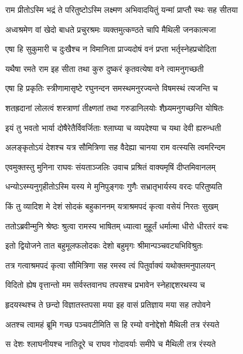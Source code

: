 \twolineshloka
{राम प्रीतोऽस्मि भद्रं ते परितुष्टोऽस्मि लक्ष्मण}
{अभिवादयितुं यन्मां प्राप्तौ स्थः सह सीतया} %

\twolineshloka
{अध्वश्रमेण वां खेदो बाधते प्रचुरश्रमः}
{व्यक्तमुत्कण्ठते चापि मैथिली जनकात्मजा} %

\twolineshloka
{एषा हि सुकुमारी च दुःखैश्च न विमानिता}
{प्राज्यदोषं वनं प्रप्ता भर्तृस्नेहप्रचोदिता} %

\twolineshloka
{यथैषा रमते राम इह सीता तथा कुरु}
{दुष्करं कृतवत्येषा वने त्वामनुगच्छती} %

\twolineshloka
{एषा हि प्रकृतिः स्त्रीणामासृष्टे रघुनन्दन}
{समस्थमनुरज्यन्ते विषमस्थं त्यजन्ति च} %

\twolineshloka
{शतह्रदानां लोलत्वं शस्त्राणां तीक्ष्णतां तथा}
{गरुडानिलयोः शैघ्र्यमनुगच्छन्ति योषितः} %

\twolineshloka
{इयं तु भवतो भार्या दोषैरेतैर्विवर्जिताः}
{श्लाघ्या च व्यपदेश्या च यथा देवी ह्यरुन्धती} %

\twolineshloka
{अलङ्कृतोऽयं देशश्च यत्र सौमित्रिणा सह}
{वैदेह्या चानया राम वत्स्यसि त्वमरिन्दम} %

\twolineshloka
{एवमुक्तस्तु मुनिना राघवः संयताञ्जलिः}
{उवाच प्रश्रितं वाक्यमृषिं दीप्तमिवानलम्} %

\twolineshloka
{धन्योऽस्म्यनुगृहीतोऽस्मि यस्य मे मुनिपुङ्गवः}
{गुणैः सभ्रातृभार्यस्य वरदः परितुष्यति} %

\twolineshloka
{किं तु व्यादिश मे देशं सोदकं बहुकाननम्}
{यत्राश्रमपदं कृत्वा वसेयं निरतः सुखम्} %

\twolineshloka
{ततोऽब्रवीन्मुनि श्रेष्ठः श्रुत्वा रामस्य भाषितम्}
{ध्यात्वा मुहूर्तं धर्मात्मा धीरो धीरतरं वचः} %

\twolineshloka
{इतो द्वियोजने तात बहुमूलफलोदकः}
{देशो बहुमृगः श्रीमान्पञ्चवट्यभिविश्रुतः} %

\twolineshloka
{तत्र गत्वाश्रमपदं कृत्वा सौमित्रिणा सह}
{रमस्व त्वं पितुर्वाक्यं यथोक्तमनुपालयन्} %

\twolineshloka
{विदितो ह्येष वृत्तान्तो मम सर्वस्तवानघ}
{तपसश्च प्रभावेन स्नेहाद्दशरथस्य च} %

\twolineshloka
{हृदयस्थश्च ते छन्दो विज्ञातस्तपसा मया}
{इह वासं प्रतिज्ञाय मया सह तपोवने} %

\twolineshloka
{अतश्च त्वामहं ब्रूमि गच्छ पञ्चवटीमिति}
{स हि रम्यो वनोद्देशो मैथिली तत्र रंस्यते} %

\twolineshloka
{स देशः श्लाघनीयश्च नातिदूरे च राघव}
{गोदावर्याः समीपे च मैथिली तत्र रंस्यते} %


